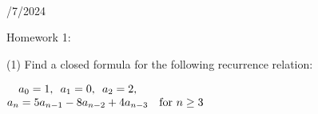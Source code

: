 \documentclass{book}
\newcommand{\hOne}{%
   \color{Black}%
   \fontsize{14}{16}\selectfont%
}
\newcommand{\myHS}{ \hspace{0.5em}}
\newcommand{\mySepTwo}[1][.]{%
   {\noindent\color{#1}{\rule{6.5in}{0.5mm}}}\\%
}
\newcommand{\retTwo}{\hfill\bigbreak}
\newcommand{\mHeader}[1]{{
   \color{Black}%
   \fontsize{20}{18}\selectfont%
   #1\retTwo
}}
\begin{document}
\mySepTwo

\hOne

\mHeader{10/7/2024}


\newpage

\hOne
\mHeader{Homework 1:}

(1) Find a closed formula for the following recurrence relation:

{\centering 
$\begin{matrix}
   a_0 = 1,\myHS a_1 = 0,\myHS a_2 = 2,\\
   a_n = 5a_{n-1} - 8a_{n-2} + 4a_{n-3} & \text{for } n \geq 3
\end{matrix}$ \retTwo\par}
\end{document}
